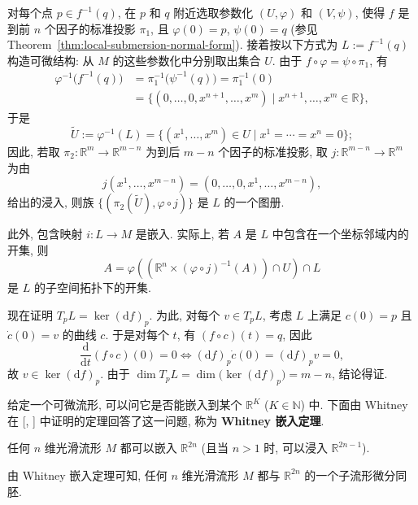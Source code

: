 \begin{RiemannProof}
对每个点 $p\in f^{-1}(q)$, 在 $p$ 和 $q$ 附近选取参数化 $(U,\varphi)$ 和 $(V,\psi)$, 使得 $f$ 是到前 $n$ 个因子的标准投影 $\pi_1$, 且 $\varphi(0)=p$, $\psi(0)=q$ (参见 Theorem~\ref{thm:local-submersion-normal-form}). 接着按以下方式为 $L:=f^{-1}(q)$ 构造可微结构: 从 $M$ 的这些参数化中分别取出集合 $U$. 由于 $f\circ\varphi=\psi\circ\pi_1$, 有
\begin{align*}
  \varphi^{-1}\bigl(f^{-1}(q)\bigr)
    &=\pi_1^{-1}\bigl(\psi^{-1}(q)\bigr)=\pi_1^{-1}(0)\\
    &=\{(0,\ldots,0,x^{n+1},\ldots,x^m)\mid x^{n+1},\ldots,x^m\in\mathbb{R}\},
\end{align*}
于是
\[
  \widetilde U:=\varphi^{-1}(L)
  =\{(x^1,\ldots,x^m)\in U\mid x^1=\cdots=x^n=0\};
\]
因此, 若取 $\pi_2:\mathbb{R}^m\to\mathbb{R}^{m-n}$ 为到后 $m-n$ 个因子的标准投影, 取 $j:\mathbb{R}^{m-n}\to\mathbb{R}^m$ 为由
\[
  j(x^1,\ldots,x^{m-n})=(0,\ldots,0,x^1,\ldots,x^{m-n}),
\]
给出的浸入, 则族 $\{(\pi_2(\widetilde U),\varphi\circ j)\}$ 是 $L$ 的一个图册.

此外, 包含映射 $i:L\to M$ 是嵌入. 实际上, 若 $A$ 是 $L$ 中包含在一个坐标邻域内的开集, 则
\[
  A=\varphi\left(\left(\mathbb{R}^n\times(\varphi\circ j)^{-1}(A)\right)\cap U\right)\cap L
\]
是 $L$ 的子空间拓扑下的开集.

现在证明 $T_pL=\ker(\mathrm{d}f)_p$. 为此, 对每个 $v\in T_pL$, 考虑 $L$ 上满足 $c(0)=p$ 且 $\dot c(0)=v$ 的曲线 $c$. 于是对每个 $t$, 有 $(f\circ c)(t)=q$, 因此
\[
  \frac{\mathrm{d}}{\mathrm{d}t}(f\circ c)(0)=0
  \Leftrightarrow(\mathrm{d}f)_p\dot c(0)=(\mathrm{d}f)_pv=0,
\]
故 $v\in\ker(\mathrm{d}f)_p$. 由于 $\dim T_pL=\dim\bigl(\ker(\mathrm{d}f)_p\bigr)=m-n$, 结论得证.
\end{RiemannProof}

给定一个可微流形, 可以问它是否能嵌入到某个 $\mathbb{R}^K$ ($K\in\mathbb{N}$) 中. 下面由 Whitney 在 [, ] 中证明的定理回答了这一问题, 称为 \textbf{Whitney 嵌入定理}.

\begin{RiemannTheorem}[Whitney]\label{thm:whitney-embedding}
任何 $n$ 维光滑流形 $M$ 都可以嵌入 $\mathbb{R}^{2n}$ (且当 $n>1$ 时, 可以浸入 $\mathbb{R}^{2n-1}$).\hfill\openbox
\end{RiemannTheorem}

\begin{RiemannRemark}\label{rem:manifold-as-euclidean-submanifold}
由 Whitney 嵌入定理可知, 任何 $n$ 维光滑流形 $M$ 都与 $\mathbb{R}^{2n}$ 的一个子流形微分同胚.
\end{RiemannRemark}

